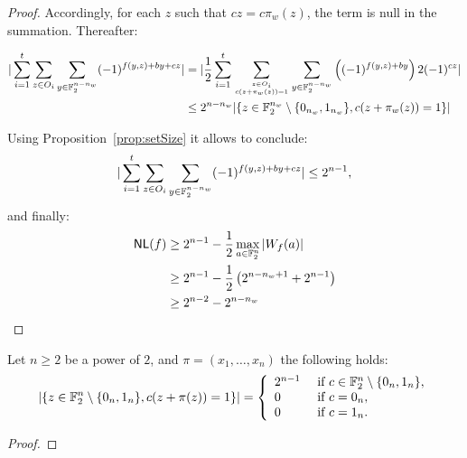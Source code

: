 \documentclass{llncs}
\begin{document}
\begin{proof}
Accordingly, for each $z$ such that $cz=c\pi_w(z)$, the term is null in the summation. Thereafter:

\begin{align*}|\sum_{i=1}^{t} \sum_{z\in O_i} \sum_{y\in \mathbb{F}_2^{n-n_w}}(-1)^{f(y,z)+by+cz}|&=|\frac{1}{2}\sum_{i=1}^{t} \sum_{z\in O_i \atop {c(z+\pi_w(z))=1}} \sum_{y\in \mathbb{F}_2^{n-n_w}} \left((-1)^{f(y,z)+by}  \right)2(-1)^{cz}|\\
&\le 2^{n-n_w} |\{ z \in \mathbb{F}_2^{n_w} \setminus \{0_{n_w},1_{n_w}\},  c(z+\pi_w(z))=1   \}|
\end{align*}

Using Proposition~\ref{prop:setSize} it allows to conclude:
\[|\sum_{i=1}^{t} \sum_{z\in O_i} \sum_{y\in \mathbb{F}_2^{n-n_w}}(-1)^{f(y,z)+by+cz}|\le 2^{n-1},\]
and finally:
\begin{align*}
\mathsf{NL}(f)&\ge 2^{n-1}-\frac{1}{2} \max_{a\in \mathbb{F}_2^n}| W_{f}(a)|\\
&\ge 2^{n-1}-\frac{1}{2} \left(2^{n-n_w+1} + 2^{n-1}\right)\\
&\ge 2^{n-2} - 2^{n-n_w}
\end{align*} 




\end{proof}



\begin{proposition}\label{prop:setSize}
	Let $n\ge 2$ be a power of $2$, and $\pi= (x_1,\ldots,x_n)$ the following holds:
\[ |\{ z \in \mathbb{F}_2^{n} \setminus \{0_{n},1_{n}\},  c(z+\pi(z))=1   \}| 
= \left \{
\begin{array}{l l}
	2^{n-1}  & \text{ if } c \in \mathbb{F}_2^n \setminus \{0_n,1_n\}, \\
	0  & \text{ if } c=0_n,\\
	0 & \text{ if } c=1_n.
\end{array}\right.\]
	
\end{proposition}
\begin{proof}
	
\end{proof}







\ifnum{}
%


\else


\fi
\end{document}
